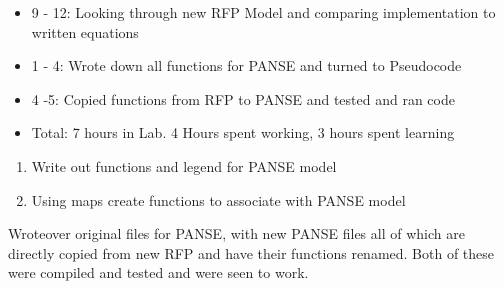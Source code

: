 \documentclass[12pt,hyperref]{labbook}
\begin{document}
\begin{itemize}
	\item 9 - 12: Looking through new RFP Model and comparing implementation to written equations
	\item 1 - 4: Wrote down all functions for PANSE and turned to Pseudocode
	\item 4 -5: Copied functions from RFP to PANSE and tested and ran code
	\item Total: 7 hours in Lab. 4 Hours spent working, 3 hours spent learning
\end{itemize}
\begin{enumerate}
	\item Write out functions and legend for PANSE model
	\item Using maps create functions to associate with PANSE model
\end{enumerate}

Wroteover original files for PANSE, with new PANSE files all of which are directly copied from new RFP and have their functions renamed. Both of these were compiled and tested and were seen to work.
\end{document}
